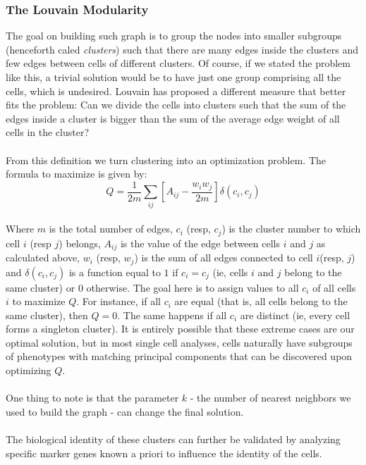 \subsubsection{The Louvain Modularity}
The goal on building such graph is to group the nodes into smaller subgroups (henceforth caled \emph{clusters}) such that there are many edges inside the clusters and few edges between cells of different clusters. Of course, if we stated the problem like this, a trivial solution would be to have just one group comprising all the cells, which is undesired. Louvain has proposed a different measure that better fits the problem: Can we divide the cells into clusters such that the sum of the edges inside a cluster is bigger than the sum of the average edge weight of all cells in the cluster? \\
\\
From this definition we turn clustering into an optimization problem. The formula to maximize is given by:
$$
Q = \frac{1}{2m}\sum_{ij} \left[ A_{ij} - \frac{w_i w_j}{2m} \right]\delta(c_i, c_j)
$$
\\
Where $m$ is the total number of edges, $c_i$ (resp, $c_j$) is the cluster number to which cell $i$ (resp $j$) belongs, $A_{ij}$ is the value of the edge between cells $i$ and $j$ as calculated above, $w_i$ (resp, $w_j$) is the sum of all edges connected to cell $i$(resp, $j$) and $\delta(c_i, c_j)$ is a function equal to $1$ if $c_i = c_j$ (ie, cells $i$ and $j$  belong to the same cluster) or $0$ otherwise. The goal here is to assign values to all $c_i$ of all cells $i$ to maximize $Q$. For instance, if all $c_i$ are equal (that is, all cells belong to the same cluster), then $Q=0$. The same happens if all $c_i$ are distinct (ie, every cell forms a singleton cluster). It is entirely possible that these extreme cases are our optimal solution, but in most single cell analyses, cells naturally have subgroups of phenotypes with matching principal components that can be discovered upon optimizing $Q$. \\
\\
One thing to note is that the parameter $k$ - the number of nearest neighbors we used to build the graph - can change the final solution. \\
\\
The biological identity of these clusters can further be validated by analyzing specific marker genes known a priori to influence the identity of the cells.

